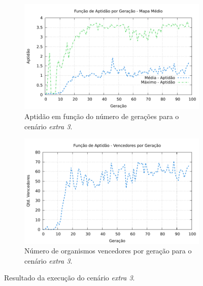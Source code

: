 
\begin{figure}[H]
\centering
	\begin{subfigure}[b]{0.4\textwidth}
        \includegraphics[width=\textwidth]{fig/extra3-fitness.pdf}
        \caption{Aptidão em função do número de gerações para o cenário
        \textit{extra 3}.}
	\end{subfigure}
	\begin{subfigure}[b]{0.4\textwidth}
        \includegraphics[width=\textwidth]{fig/extra3-winners.pdf}
        \caption{Número de organismos vencedores por geração para o cenário
        \textit{extra 3}.}
	\end{subfigure}

    \caption{Resultado da execução do cenário \textit{extra 3}.}
	\label{fig:extra3-results}
\end{figure}

